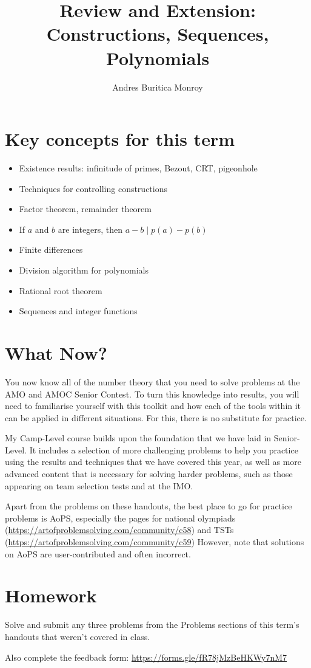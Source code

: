 \documentclass{article}
\title{Review and Extension: Constructions, Sequences, Polynomials}
\author{Andres Buritica Monroy}
\date{}
\begin{document}
\maketitle
\section{Key concepts for this term}
\begin{itemize}
	\item Existence results: infinitude of primes, Bezout, CRT, pigeonhole
	\item Techniques for controlling constructions
	\item Factor theorem, remainder theorem
	\item If $a$ and $b$ are integers, then $a-b\mid p(a)-p(b)$
	\item Finite differences
	\item Division algorithm for polynomials
	\item Rational root theorem
	\item Sequences and integer functions
\end{itemize}
\section{What Now?}
You now know all of the number theory that you need to solve problems at
the AMO and AMOC Senior Contest. To turn this knowledge into results, you will
need to familiarise yourself with this toolkit and how each of the tools within it
can be applied in different situations. For this, there is no substitute for
practice.

My Camp-Level course builds upon the foundation that we have laid in
Senior-Level. It includes a selection of more challenging problems to help you
practice using the results and techniques that we have covered this year, as
well as more advanced content that is necessary for solving harder
problems, such as those appearing on team selection tests and at the IMO\@.

Apart from the problems on these handouts, the best place to go for
practice problems is AoPS, especially
the pages for national olympiads
(\url{https://artofproblemsolving.com/community/c58})
and TSTs (\url{https://artofproblemsolving.com/community/c59})
However, note that solutions on AoPS are user-contributed and often incorrect.
\section{Homework}
Solve and submit any three problems from the Problems sections of this
term's handouts that weren't covered in class.

Also complete the feedback form:
\url{https://forms.gle/fR78jMzBeHKWy7nM7}
\end{document}
